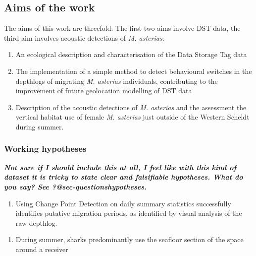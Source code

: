 \documentclass[
  authoryear,
  review,
  3p]{elsarticle}
\providecommand{\tightlist}{%
  \setlength{\itemsep}{0pt}\setlength{\parskip}{0pt}}\usepackage{longtable,booktabs,array}
\begin{document}
\hypertarget{sec-introaims}{%
\subsection{Aims of the work}\label{sec-introaims}}

The aims of this work are threefold. The first two aims involve DST
data, the third aim involves acoustic detections of \emph{M. asterias}:

\begin{enumerate}
\def\labelenumi{\arabic{enumi}.}
\tightlist
\item
  An ecological description and characterisation of the Data Storage Tag
  data
\item
  The implementation of a simple method to detect behavioural switches
  in the depthlogs of migrating \emph{M. asterias} individuals,
  contributing to the improvement of future geolocation modelling of DST
  data
\item
  Description of the acoustic detections of \emph{M. asterias} and the
  assessment the vertical habitat use of female \emph{M. asterias} just
  outside of the Western Scheldt during summer.
\end{enumerate}

\hypertarget{working-hypotheses}{%
\subsubsection{Working hypotheses}\label{working-hypotheses}}

\textbf{\emph{Not sure if I should include this at all, I feel like with
this kind of dataset it is tricky to state clear and falsifiable
hypotheses. What do you say? See \textbf{?@sec-questionshypotheses}.}}

\begin{enumerate}
\def\labelenumi{\arabic{enumi}.}
\tightlist
\item
  Using Change Point Detection on daily summary statistics successfully
  identifies putative migration periods, as identified by visual
  analysis of the raw depthlog.
\end{enumerate}

\begin{enumerate}
\def\labelenumi{\arabic{enumi}.}
\setcounter{enumi}{1}
\tightlist
\item
  During summer, sharks predominantly use the seafloor section of the
  space around a receiver
\end{enumerate}
\end{document}
